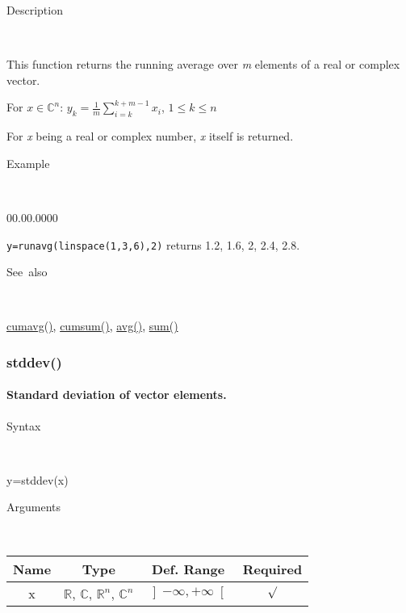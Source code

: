 \begin{description}
\item [Description]~
\end{description}
This function returns the running average over \textit{m} elements
of a real or complex vector.

\medskip{}
For $x\in$$\mathbb{C}^{n}$: $y_{k}=$${\displaystyle \frac{1}{m}}$$\sum\limits _{i=k}^{k+m-1}x_{i}$,
$1\leq k\leq n$
\medskip{}

For \textit{x} being a real or complex number, \textit{x}
itself is returned.

\begin{description}
\item [Example]~
\end{description}
\begin{lyxlist}{00.00.0000}
\item [\texttt{y=runavg(linspace(1,3,6),2)}]returns 1.2, 1.6, 2, 2.4, 2.8.
\end{lyxlist}
\begin{description}
\item [See~also]~
\end{description}
\textcolor{blue}{\hyperlink{cumavg}{cumavg()}}\textcolor{black}{,}
\textcolor{blue}{\hyperlink{cumsum}{cumsum()}}\textcolor{black}{,}
\textcolor{blue}{\hyperlink{avg}{avg()}}\textcolor{black}{,} \textcolor{blue}{\hyperlink{sum}{sum()}}


\newpage
\subsubsection*{\hypertarget{stddev}{}{\Large stddev()}}


\paragraph{\label{par:Standard-deviation}Standard deviation of vector elements.}

\begin{description}
\item [Syntax]~
\end{description}
y=stddev(x)

\begin{description}
\item [Arguments]~
\end{description}
\begin{tabular}{|c|c|c|c|}
\hline 
Name&
Type&
Def. Range&
Required\tabularnewline
\hline
\hline 
x&
$\mathbb{R}$, $\mathbb{C}$, $\mathbb{R}^{n}$, $\mathbb{C}^{n}$&
$\left]-\infty,+\infty\right[$&
$\surd$\tabularnewline
\hline
\end{tabular}

